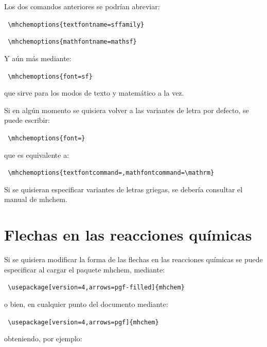 \vspace{1ex}
Los dos comandos anteriores se podrían abreviar:

\vspace{1ex}
\texttt{%
  \textbackslash mhchemoptions\{textfontname=sffamily\}
}

\vspace{1ex}
\texttt{%
  \textbackslash mhchemoptions\{mathfontname=mathsf\}
}

\vspace{1ex}
Y aún más mediante:

\vspace{1ex}
\texttt{%
  \textbackslash mhchemoptions\{font=sf\}
}

\vspace{1ex}
 que sirve para los modos de texto y matemático a la vez.

\vspace{2ex}
Si en algún momento se quisiera volver a las variantes de letra por defecto, se
puede escribir:

\vspace{1ex}
\texttt{%
  \textbackslash mhchemoptions\{font=\}
}

\vspace{1ex}
 que es equivalente a:

\vspace{1ex}
\texttt{%
  \textbackslash mhchemoptions\{textfontcommand=,mathfontcommand=\textbackslash mathrm\}
}

Si se quisieran especificar variantes de letras griegas, se debería consultar el
manual de {\sffamily mhchem}.


\section{Flechas en las reacciones químicas}
Si se quisiera modificar la forma de las flechas en las reacciones químicas
se puede especificar al cargar el paquete {\sffamily mhchem}, mediante:

\vspace{1ex}
\texttt{%
  \textbackslash usepackage[version=4,arrows=pgf-filled]\{mhchem\}
}

\vspace{1ex}
 o bien, en cualquier punto del documento mediante:

\vspace{1ex}
\texttt{%
  \textbackslash usepackage[version=4,arrows=pgf]\{mhchem\}
}

\vspace{1ex}
 obteniendo, por ejemplo:

